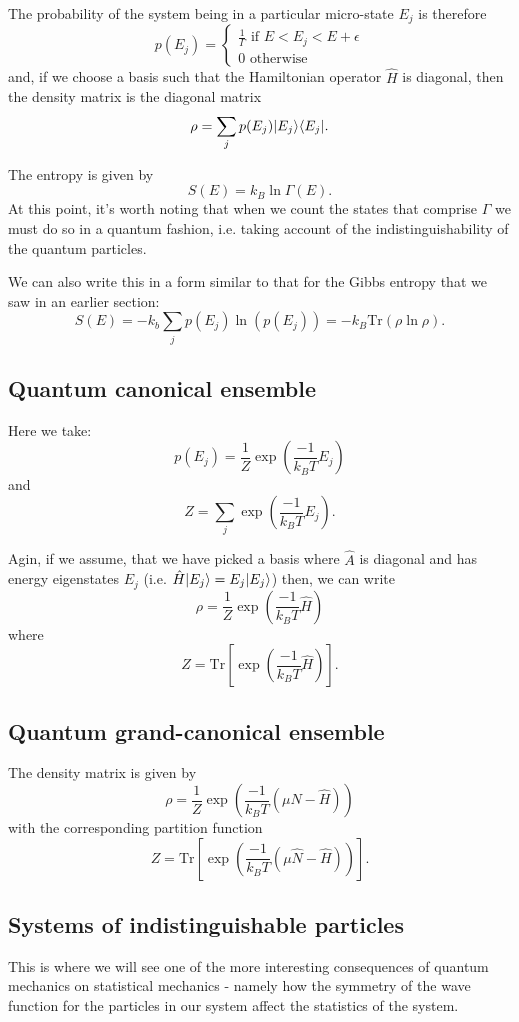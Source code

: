 \documentclass{article}
\begin{document}
The probability of the system being in a particular micro-state $E_j$ is therefore
$$
	p(E_j) =
	\begin{cases}
		\frac{1}{\Gamma} \text{ if } E<E_j<E+\epsilon\\
		0 \text{ otherwise}
	\end{cases}
$$
and, if we choose a basis such that the Hamiltonian operator $\hat{H}$ is diagonal, then the density matrix is the diagonal matrix
$$
	\rho = \sum_j p(E_j) | E_j \rangle\langle E_j |.
$$

The entropy is given by
$$
	S(E) = k_B\ln\Gamma(E).
$$
At this point, it's worth noting that when we count the states that comprise $\Gamma$ we must do so in a quantum fashion, i.e. taking account of the indistinguishability of the quantum particles.

We can also write this in a form similar to that for the Gibbs entropy that we saw in an earlier section:
$$
	S(E) = -k_b\sum_jp(E_j)\ln(p(E_j))=-k_B\text{Tr}(\rho\ln\rho).
$$ 

\subsection{Quantum canonical ensemble}
Here we take:
$$
	p(E_j) = \frac{1}{Z}\exp\left(\frac{-1}{k_BT}E_j\right)
$$
and
$$
	Z = \sum_j \exp\left(\frac{-1}{k_BT}E_j\right).
$$

Agin, if we assume, that we have picked a basis where $\hat{A}$ is diagonal and has energy eigenstates $E_j$ (i.e. $\hat{H}| E_j \rangle = E_j| E_j \rangle$) then, we can write
$$
	\rho = \frac{1}{Z}\exp\left(\frac{-1}{k_BT}\hat{H}\right)
$$
where
$$
	Z = \text{Tr}\left[\exp\left(\frac{-1}{k_BT}\hat{H}\right)\right].
$$

\subsection{Quantum grand-canonical ensemble}
The density matrix is given by
$$
	\rho = \frac{1}{Z}\exp\left(\frac{-1}{k_BT}(\mu\hat{N}-\hat{H})\right)
$$
with the corresponding partition function
$$
	Z = \text{Tr}\left[\exp\left(\frac{-1}{k_BT}(\mu\hat{N}-\hat{H})\right)\right].
$$

\subsection{Systems of indistinguishable particles}
This is where we will see one of the more interesting consequences of quantum mechanics on statistical mechanics - namely how the symmetry of the wave function for the particles in our system affect the statistics of the system.
\end{document}
